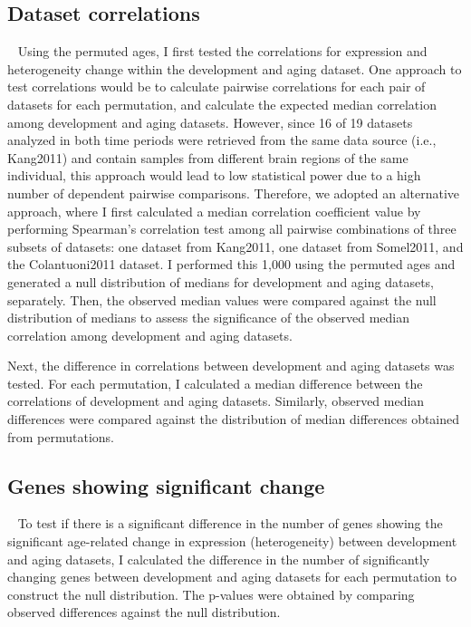 \subsection{Dataset correlations}~\label{subsec:perm.corr}
Using the permuted ages, I first tested the correlations for expression and heterogeneity change within the development and aging dataset.
One approach to test correlations would be to calculate pairwise correlations for each pair of datasets for each permutation,
and calculate the expected median correlation among development and aging datasets.
However, since 16 of 19 datasets analyzed in both time periods were retrieved from the same data source (i.e., Kang2011) and contain samples from different brain regions of the same individual,
this approach would lead to low statistical power due to a high number of dependent pairwise comparisons.
Therefore, we adopted an alternative approach, where I first calculated a median correlation coefficient value
by performing Spearman's correlation test among all pairwise combinations of three subsets of datasets: one dataset from Kang2011, one dataset from Somel2011, and the Colantuoni2011 dataset.
I performed this 1,000 using the permuted ages and generated a null distribution of medians for development and aging datasets, separately. 
Then, the observed median values were compared against the null distribution of medians to assess the significance of the observed median correlation among development and aging datasets.

Next, the difference in correlations between development and aging datasets was tested. 
For each permutation, I calculated a median difference between the correlations of development and aging datasets.
Similarly, observed median differences were compared against the distribution of median differences obtained from permutations.

\subsection{Genes showing significant change}~\label{subsec:perm.sig.change}
To test if there is a significant difference in the number of genes showing the significant age-related change in expression (heterogeneity) between development and aging datasets,
I calculated the difference in the number of significantly changing genes between development and aging datasets for each permutation to construct the null distribution.
The p-values were obtained by comparing observed differences against the null distribution.


